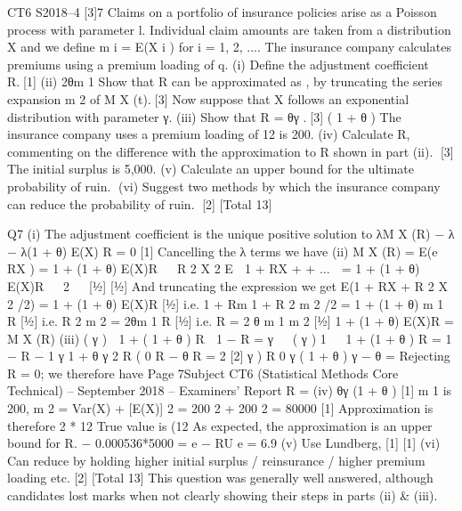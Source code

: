 CT6 S2018–4
[3]7
Claims on a portfolio of insurance policies arise as a Poisson process with parameter
l. Individual claim amounts are taken from a distribution X and we define
m i = E(X i ) for i = 1, 2, .... The insurance company calculates premiums using a
premium loading of q.
(i) Define the adjustment coefficient R.[1]
(ii) 2θm 1
Show that R can be approximated as
, by truncating the series expansion
m 2
of M X (t).[3]
Now suppose that X follows an exponential distribution with parameter γ.
(iii)
Show that R =
θγ
.[3]
( 1 + θ )
The insurance company uses a premium loading of 12%
is 200.
(iv)
Calculate R, commenting on the difference with the approximation to R shown
in part (ii).
[3]
The initial surplus is 5,000.
(v) Calculate an upper bound for the ultimate probability of ruin.
(vi) Suggest two methods by which the insurance company can reduce the
probability of ruin.
[2]
[Total 13]


Q7
(i)
The adjustment coefficient is the unique positive solution to
λM X (R) − λ − λ(1 + θ) E(X) R = 0
[1]
Cancelling the λ terms we have
(ii)
M X (R) = E(e RX ) = 1 + (1 + θ) E(X)R


R 2 X 2
E  1 + RX +
+ ...  = 1 + (1 + θ) E(X)R


2


[1⁄2]
[1⁄2]
And truncating the expression we get
E(1 + RX + R 2 X 2 /2) = 1 + (1 + θ) E(X)R [1⁄2]
i.e. 1 + Rm 1 + R 2 m 2 /2 = 1 + (1 + θ) m 1 R [1⁄2]
i.e. R 2 m 2 = 2θm 1 R [1⁄2]
i.e. R =
2 θ m 1
m 2
[1⁄2]
1 + (1 + θ) E(X)R = M X (R)
(iii)
( γ )
 1 + ( 1 + θ ) R  1 − R =
γ   (
γ ) 1
 
1 + (1 + θ ) R = 1 − R
− 1
γ
1 + θ
γ 2
R
(
0
R − θ R =
2
[2]
γ
)
R
0
γ ( 1 + θ ) γ − θ =
Rejecting R = 0; we therefore have
Page 7Subject CT6 (Statistical Methods Core Technical) – September 2018 – Examiners’ Report
R =
(iv)
θγ
(1 + θ )
[1]
m 1 is 200, m 2 = Var(X) + [E(X)] 2 = 200 2 + 200 2 = 80000
[1]
Approximation is therefore 2 * 12%
True value is (12%
As expected, the approximation is an upper bound for R.
− 0.000536*5000
=
e − RU e =
6.9%
(v) Use Lundberg, [1]
[1]
(vi) Can reduce by holding higher initial surplus / reinsurance / higher premium
loading etc.
[2]
[Total 13]
This question was generally well answered, although candidates lost marks when not clearly
showing their steps in parts (ii) & (iii).
